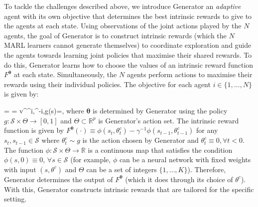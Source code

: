 \documentclass{article}
\makeatletter
\newenvironment{smalleralign}[1][\small]
 {\par\nopagebreak\leavevmode\vspace*{-\baselineskip}%
  \skip0=\abovedisplayskip
  #1%
  \def\maketag@@@##1{\hbox{\m@th\normalfont\normalsize##1}}%
  \abovedisplayskip=\skip0
  \align}
 {\endalign\ignorespacesafterend}
\makeatother
\begin{document}
To tackle the challenges described above, we introduce {\selectfont Generator}  an \textit{adaptive} agent with its own objective that determines the best intrinsic rewards to give to the agents at each state.  Using observations of the joint actions played by the $N$ agents, the goal of {\selectfont Generator} is to construct intrinsic rewards (which the $N$ MARL learners cannot generate themselves) to coordinate exploration and guide the agents towards learning joint policies that maximise their shared rewards. 
% 
% 
% 
% 
% 
% 
To do this, {\selectfont Generator} learns how to choose the values of an intrinsic reward function $F^{\boldsymbol{\theta}}$ at each state. 
Simultaneously, the $N$ agents perform actions to maximise their rewards using their individual policies.  The objective for each agent $i\in\{1,\ldots,N\}$ is given by: 
\begin{smalleralign}
v^{\pi^i,\pi^{-i},g}(s)=\left[\sum_{t=0}^\infty \gamma^t\left(R+F^{\boldsymbol{\theta}}\right)\Big|s_0=s\right], \nonumber
\end{smalleralign}
where 
$\boldsymbol{\theta}$ is determined by {\selectfont Generator} using the policy $g:\mathcal{S}\times\Theta\to[0,1]$ and $\Theta\subset\mathbb{R}^p$ is {\selectfont Generator}'s action set. The intrinsic reward function is given by $
    F^{\boldsymbol{\theta}}(\cdot)\equiv \phi(s_t,\theta^c_t)-\gamma^{-1}\phi(s_{t-1},\theta^c_{t-1})$ for any $s_t,s_{t-1}\in\mathcal{S}$
% 
where $\theta^c_t\sim g$  is the action chosen by {\selectfont Generator} and $\theta^c_t\equiv 0, \forall t<0$. The function $\phi:\mathcal{S}\times\Theta\to \mathbb{R}$ is a continuous map that satisfies the condition $\phi(s,0)\equiv 0$, $\forall s\in\mathcal{S}$ (for example, $\phi$ can be  a neural network with fixed weights with input $(s,\theta^c)$ and $\Theta$ can be a set of integers $\{1,\ldots,K\}$).
Therefore, {\selectfont Generator} determines the output of $F^{\boldsymbol{\theta}}$ (which it does through its choice of $\theta^c$). With this, {\selectfont Generator} constructs intrinsic rewards that are tailored for the specific setting. 
\end{document}
